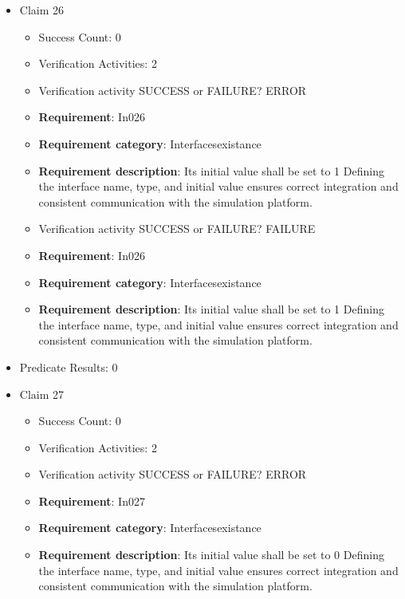 \documentclass{article}
\begin{document}
\begin{itemize}
  				  \item Claim 26
				\begin{itemize}
			    	\item Success Count: 0 
			    	\item Verification Activities: 2
					\item Verification activity SUCCESS or FAILURE? ERROR
		
						\item \textbf{Requirement}: In026 
						\item \textbf{Requirement category}: Interfacesexistance 
						\item \textbf{Requirement description}: Its initial value shall be set to 1 Defining the interface name, type, and initial value ensures correct integration and consistent communication with the simulation platform.
					
					\item Verification activity SUCCESS or FAILURE? FAILURE
		
						\item \textbf{Requirement}: In026 
						\item \textbf{Requirement category}: Interfacesexistance 
						\item \textbf{Requirement description}: Its initial value shall be set to 1 Defining the interface name, type, and initial value ensures correct integration and consistent communication with the simulation platform.
					
				\end{itemize}
				
									    
				\item Predicate Results: 0

  				  \item Claim 27
				\begin{itemize}
			    	\item Success Count: 0 
			    	\item Verification Activities: 2
					\item Verification activity SUCCESS or FAILURE? ERROR
		
						\item \textbf{Requirement}: In027 
						\item \textbf{Requirement category}: Interfacesexistance 
						\item \textbf{Requirement description}: Its initial value shall be set to 0 Defining the interface name, type, and initial value ensures correct integration and consistent communication with the simulation platform.
					

\end{itemize}
\end{itemize}
\end{document}
